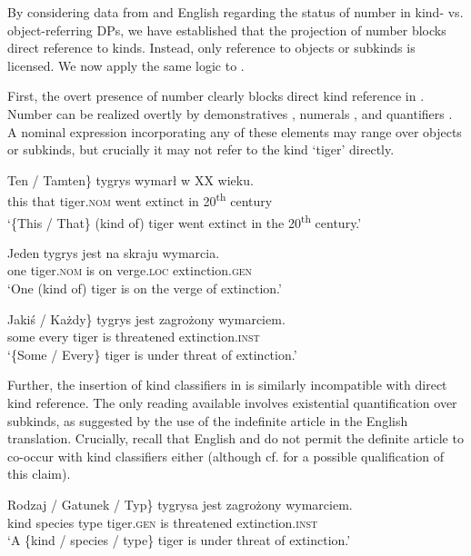 \documentclass[output=paper]{langscibook}
\begin{document}
By considering data from  and English regarding the status of number in kind- vs. object-referring DPs, we have established that the projection of number blocks direct reference to kinds. Instead, only reference to objects or subkinds is licensed.
We now apply the same logic to .

First, the overt presence of number clearly blocks direct kind reference in . Number can be realized overtly by demonstratives , numerals , and quantifiers . A nominal expression incorporating any of these elements may range over objects or subkinds, but crucially it may not refer to the kind `tiger' directly.

\ea \label{ex:tiger}
\ea \gll
\minsp{\{} Ten / Tamten\} tygrys wymarł w XX wieku.\\
{} this {} that tiger.\textsc{nom} {went extinct} in 20\textsuperscript{th} century\\
\glt `\{This / That\} (kind of) tiger went extinct in the 20\textsuperscript{th} century.'
\label{ex:tiger_dem}

\ex \gll
Jeden tygrys jest na skraju wymarcia.\\
one tiger.\textsc{nom} is on verge.\textsc{loc} extinction.\textsc{gen}\\
\glt `One (kind of) tiger is on the verge of extinction.'
\label{ex:tiger_num}

\ex \gll
\minsp{\{} Jakiś / Każdy\} tygrys jest zagrożony wymarciem.\\
{} some {} every tiger is threatened extinction.\textsc{inst}\\
\glt `\{Some / Every\} tiger is under threat of extinction.'
\label{ex:tiger_quant}
\z \z

\noindent
Further, the insertion of kind classifiers in  is similarly incompatible with direct kind reference. The only reading available involves existential quantification over subkinds, as suggested by the use of the indefinite article in the English translation. Crucially, recall that English and  do not permit the definite article to co-occur with kind classifiers either (although cf.  for a possible qualification of this claim).

\ea \gll
\minsp{\{} Rodzaj / Gatunek / Typ\} tygrysa jest zagrożony wymarciem.\\
{} kind {} species {} type tiger.\textsc{gen} is threatened extinction.\textsc{inst}\\
\glt `A \{kind / species / type\} tiger is under threat of extinction.'
\label{ex:tiger_class}
\z
\end{document}
